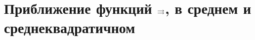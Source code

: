 

\section{Приближение функций \texorpdfstring{$\rightrightarrows$}{равномерно}, в среднем и среднеквадратичном}

 
 
 
 
 
 

%  
%  
